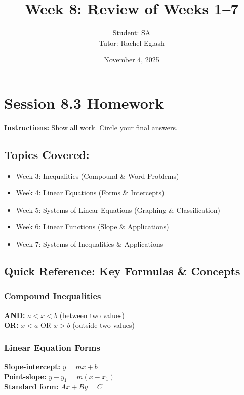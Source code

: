 \documentclass[12pt]{article}
\title{Week 8: Review of Weeks 1--7}
\author{
	Student: SA\\
	Tutor: Rachel Eglash}
\date{November 4, 2025}
\begin{document}
	
	\maketitle

	\section*{Session 8.3 Homework}
        
        \textbf{Instructions:} Show all work. Circle your final answers.
        
        \subsection*{Topics Covered:}
        \begin{itemize}
            \item Week 3: Inequalities (Compound \& Word Problems)
            \item Week 4: Linear Equations (Forms \& Intercepts)
            \item Week 5: Systems of Linear Equations (Graphing \& Classification)
            \item Week 6: Linear Functions (Slope \& Applications)
            \item Week 7: Systems of Inequalities \& Applications
        \end{itemize}
	    
        \newpage
	
	    \subsection*{Quick Reference: Key Formulas \& Concepts}
	
	        \subsubsection*{Compound Inequalities}
		    	\textbf{AND:} $a < x < b$ (between two values) \\
                \textbf{OR:} $x < a$ OR $x > b$ (outside two values)
	
	        \subsubsection*{Linear Equation Forms}
			    \textbf{Slope-intercept:} $y = mx + b$ \\
                \textbf{Point-slope:} $y - y_1 = m(x - x_1)$ \\
                \textbf{Standard form:} $Ax + By = C$
	
\end{document}

